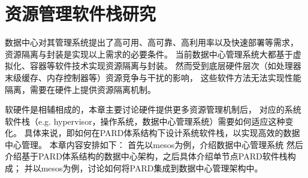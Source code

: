 

\chapter{资源管理软件栈研究}
\label{chap:prm}


数据中心对其管理系统提出了高可用、高可靠、高利用率以及快速部署等需求，
资源隔离与封装是实现以上需求的必要条件。
当前数据中心管理系统大都基于虚拟化、容器等软件技术实现资源隔离与封装。
然而受到底层硬件层次（如处理器末级缓存、内存控制器等）资源竞争与干扰的影响，
这些软件方法无法实现性能隔离，需要在硬件上提供资源隔离机制。


软硬件是相辅相成的，本章主要讨论硬件提供更多资源管理机制后，
对应的系统软件栈（e.g. hypervisor，操作系统，数据中心管理系统）需要如何适应这种变化。
具体来说，即如何在PARD体系结构下设计系统软件栈，以实现高效的数据中心管理。
本章内容安排如下：
首先以mesos为例，介绍数据中心管理系统
然后介绍基于PARD体系结构的数据中心架构，之后具体介绍单节点PARD软件栈构成；
并以mesos为例，讨论如何将PARD集成到数据中心管理架构中。


